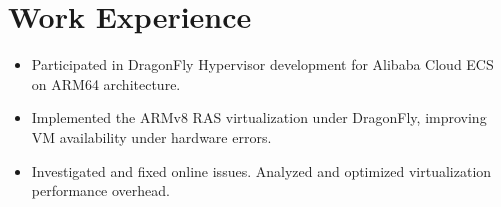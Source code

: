 \documentclass{resume}
\newcommand{\en}[1]{#1}
\newcommand{\zh}[1]{}
\begin{document}
\section{\en{Work Experience}\zh{工作经历}}
\en{}
\zh{\datedsubsection{\textbf{\href{https://www.aliyun.com/}{阿里云}}}{05/2023 -- 至今}}
\en{}
\zh{\role{虚拟化研发实习}{弹性计算-神龙虚拟化}}
\begin{itemize}
      \item \en {
            Participated in DragonFly Hypervisor development for Alibaba Cloud ECS on ARM64 architecture.
      }
      \zh {
            参与 ARM64 架构、倚天平台上神龙 Hypervisor 的研发。
      }
      \item \en {
            Implemented the ARMv8 RAS virtualization under DragonFly, improving VM availability under hardware errors.
      }
      \zh {
            在神龙架构下，实现了 ARMv8 RAS 功能扩展的虚拟化，提高了虚拟机在硬件错误下的可用性。
      }
      \item \en {
            Investigated and fixed online issues. Analyzed and optimized virtualization performance overhead.
      }
      \zh {
            线上问题的排查与修复。虚拟机性能开销的分析与优化。
      }
\end{itemize}
\en{}
\zh{\datedsubsection{\textbf{\href{https://www.bytedance.com/}{字节跳动}}}{09/2021 -- 04/2023}}
\en{}
\zh{\role{Rust 研发实习}{Lark Cross Platform Infrastructure}}
\end{document}
